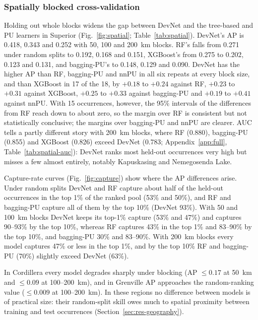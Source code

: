 \documentclass[pdflatex,sn-apa]{sn-jnl}
\begin{document}
\subsubsection{Spatially blocked cross-validation}\label{sec:res-spatial}

Holding out whole blocks widens the gap between DevNet and the tree-based and PU learners in Superior (Fig.~\ref{fig:spatial}; Table~\ref{tab:spatial}). DevNet's AP is 0.418, 0.343 and 0.252 with 50, 100 and 200~km blocks. RF's falls from 0.271 under random splits to 0.192, 0.168 and 0.151, XGBoost's from 0.275 to 0.202, 0.123 and 0.131, and bagging-PU's to 0.148, 0.129 and 0.090. DevNet has the higher AP than RF, bagging-PU and nnPU in all six repeats at every block size, and than XGBoost in 17 of the 18, by $+0.18$ to $+0.24$ against RF, $+0.23$ to $+0.31$ against XGBoost, $+0.25$ to $+0.33$ against bagging-PU and $+0.19$ to $+0.41$ against nnPU. With 15 occurrences, however, the 95\% intervals of the differences from RF reach down to about zero, so the margin over RF is consistent but not statistically conclusive; the margins over bagging-PU and nnPU are clearer. AUC tells a partly different story with 200~km blocks, where RF (0.880), bagging-PU (0.855) and XGBoost (0.826) exceed DevNet (0.783; Appendix~\ref{app:full}, Table~\ref{tab:spatial-auc}): DevNet ranks most held-out occurrences very high but misses a few almost entirely, notably Kapuskasing and Nemegosenda Lake.

Capture-rate curves (Fig.~\ref{fig:capture}) show where the AP differences arise. Under random splits DevNet and RF capture about half of the held-out occurrences in the top 1\% of the ranked pool (53\% and 50\%), and RF and bagging-PU capture all of them by the top 10\% (DevNet 93\%). With 50 and 100~km blocks DevNet keeps its top-1\% capture (53\% and 47\%) and captures 90--93\% by the top 10\%, whereas RF captures 43\% in the top 1\% and 83--90\% by the top 10\%, and bagging-PU 30\% and 83--90\%. With 200~km blocks every model captures 47\% or less in the top 1\%, and by the top 10\% RF and bagging-PU (70\%) slightly exceed DevNet (63\%).

In Cordillera every model degrades sharply under blocking (AP $\leq 0.17$ at 50~km and $\leq 0.09$ at 100--200~km), and in Grenville AP approaches the random-ranking value ($\leq 0.009$ at 100--200~km). In these regions no difference between models is of practical size: their random-split skill owes much to spatial proximity between training and test occurrences (Section~\ref{sec:res-geography}).
\end{document}
